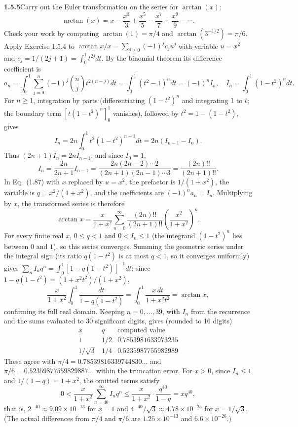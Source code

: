 \par\bigskip
\noindent\textbf{1.5.5}\quad Carry out the Euler transformation on the series
for $\arctan(x)$:
\[
\arctan(x)=x-\frac{x^{3}}{3}+\frac{x^{5}}{5}-\frac{x^{7}}{7}
+\frac{x^{9}}{9}-\cdots.
\]
Check your work by computing $\arctan(1)=\pi/4$ and
$\arctan(3^{-1/2})=\pi/6$.
\solution
Apply Exercise 1.5.4 to
$\arctan x/x=\sum_{j\ge0}(-1)^jc_ju^j$ with variable $u=x^2$ and
$c_j=1/(2j+1)=\int_0^1t^{2j}dt$. By the binomial theorem its difference
coefficient is
\[
 a_n=\int_0^1\sum_{j=0}^n(-1)^j\binom nj t^{2(n-j)}dt
     =\int_0^1(t^2-1)^n dt=(-1)^n I_n,
 \quad I_n=\int_0^1(1-t^2)^n dt.
\]
For $n\ge1$, integration by parts (differentiating $(1-t^2)^n$ and
integrating $1$ to $t$; the boundary term $[t(1-t^2)^n]_0^1$ vanishes),
followed by $t^2=1-(1-t^2)$, gives
\[
 I_n=2n\int_0^1t^2(1-t^2)^{n-1}dt=2n(I_{n-1}-I_n).
\]
Thus $(2n+1)I_n=2nI_{n-1}$, and since $I_0=1$,
\[
 I_n=\frac{2n}{2n+1}I_{n-1}
 =\frac{2n(2n-2)\cdots2}{(2n+1)(2n-1)\cdots3}=\frac{(2n)!!}{(2n+1)!!}.
\]
In Eq.~(1.87) with $x$ replaced by $u=x^2$, the prefactor is
$1/(1+x^2)$, the variable is $q=x^2/(1+x^2)$, and the coefficients are
$(-1)^na_n=I_n$. Multiplying by $x$, the transformed series is therefore
\[
 \boxed{\arctan x=\frac{x}{1+x^2}
 \sum_{n=0}^\infty\frac{(2n)!!}{(2n+1)!!}
       \left(\frac{x^2}{1+x^2}\right)^n}.
\]
For every finite real $x$, $0\le q<1$ and $0<I_n\le1$ (the
integrand $(1-t^2)^n$ lies between $0$ and $1$), so this series
converges. Summing the geometric series under the integral sign (its
ratio $q(1-t^2)$ is at most $q<1$, so it converges uniformly) gives
$\sum_nI_nq^n=\int_0^1[1-q(1-t^2)]^{-1}dt$; since
$1-q(1-t^2)=(1+x^2t^2)/(1+x^2)$,
\[
 \frac{x}{1+x^2}\int_0^1\frac{dt}{1-q(1-t^2)}
 =\int_0^1\frac{x\,dt}{1+x^2t^2}=\arctan x,
\]
confirming its full real domain.
Keeping $n=0,\ldots,39$, with $I_n$ from the recurrence and the sums
evaluated to 30 significant digits, gives (rounded to 16 digits)
\[
 \begin{array}{c|c|c}
 x&q&\text{computed value}\\\hline
 1&1/2&0.7853981633973235\\
 1/\sqrt3&1/4&0.5235987755982989
 \end{array}
\]
These agree with $\pi/4=0.78539816339744830\ldots$ and
$\pi/6=0.52359877559829887\ldots$ within the truncation error. For
$x>0$, since $I_n\le1$ and $1/(1-q)=1+x^2$, the omitted terms satisfy
\[
 0<\frac{x}{1+x^2}\sum_{n=40}^\infty I_nq^n
 \le\frac{x}{1+x^2}\cdot\frac{q^{40}}{1-q}=xq^{40},
\]
that is, $2^{-40}\approx9.09\times10^{-13}$ for $x=1$ and
$4^{-40}/\sqrt3\approx4.78\times10^{-25}$ for $x=1/\sqrt3$. (The actual
differences from $\pi/4$ and $\pi/6$ are $1.25\times10^{-13}$ and
$6.6\times10^{-26}$.)


